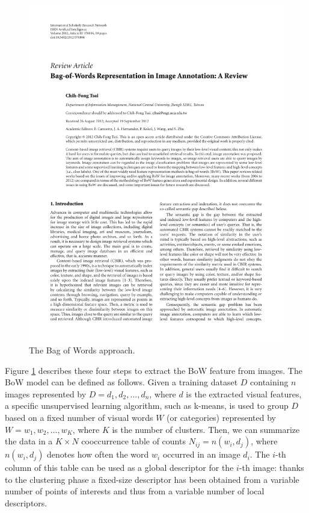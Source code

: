 \begin{figure}[htbp]
	\centering
		\includegraphics[page=3]{Figures/376804_cropped.pdf}
	\caption{The Bag of Words approach.}
	\label{fig:BoW}
\end{figure}

Figure \ref{fig:BoW} describes these four steps to extract the BoW feature from images. The BoW model can be defined as follows. Given a training dataset $D$ containing $n$ images represented by $D = d_1, d_2, \text{...}, d_n$, where $d$ is the extracted visual features, a specific unsupervised learning algorithm, such as k-means, is used to group $D$ based on a fixed number of visual words $W$ (or categories) represented by $W = w_1,w_2, \text{...}, w_K$, where $K$ is the number of clusters. Then, we can summarize the data in a $K\times N$ cooccurrence table of counts $N_{i j} = n(w_i, d_j )$, where $n(w_i, d_j)$ denotes how often the word $w_i$ occurred in an image $d_i$. The $i$-th column of this table can be used as a global descriptor for the $i$-th image: thanks to the clustering phase a fixed-size descriptor has been obtained from a variable number of points of interests and thus from a variable number of local descriptors.

